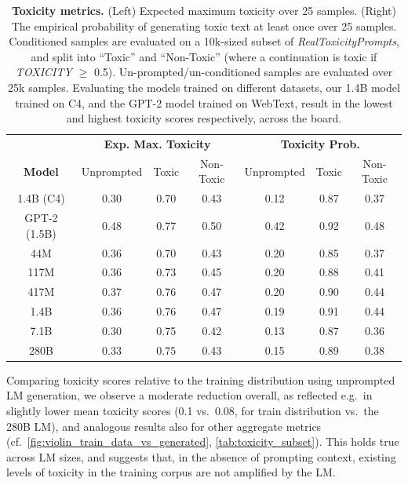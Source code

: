\documentclass[11pt, a4paper, logo, internal, copyright, nonumbering]{deepmind}
\begin{document}
\begin{table}
    \centering
    \begin{tabular}{c|ccc|ccc}
    \toprule
        \textbf{} & \multicolumn{3}{c}{\textbf{Exp. Max. Toxicity}} & \multicolumn{3}{c}{\textbf{Toxicity Prob.}} \\
        \textbf{Model} & Unprompted & Toxic & Non-Toxic & Unprompted & Toxic & Non-Toxic \\        
        \midrule
         1.4B (C4) & 0.30 & 0.70 & 0.43 & 0.12 & 0.87 & 0.37 \\
         GPT-2 (1.5B) & 0.48 & 0.77 & 0.50 & 0.42 & 0.92 & 0.48 \\
        \midrule
         44M & 0.36 & 0.70 & 0.43 & 0.20 & 0.85 & 0.37  \\
         117M & 0.36 & 0.73 & 0.45 & 0.20 & 0.88 & 0.41 \\
         417M & 0.37 & 0.76 & 0.47 & 0.20 & 0.90 & 0.44 \\
         1.4B & 0.36 & 0.76 & 0.47 & 0.19  & 0.91 & 0.44 \\
         7.1B   & 0.30 & 0.75  & 0.42  & 0.13  & 0.87  & 0.36 \\
         280B & 0.33  & 0.75  & 0.43  & 0.15  & 0.89  & 0.38 \\
         \bottomrule
    \end{tabular}
    \caption{\textbf{Toxicity metrics.} (Left) Expected maximum toxicity over 25 samples. (Right) The empirical probability of generating toxic text at least once over 25 samples. Conditioned samples are evaluated on a 10k-sized subset of \textit{RealToxicityPrompts}, and split into ``Toxic'' and ``Non-Toxic'' (where a continuation is toxic if \textit{TOXICITY} $\geq$ 0.5). Un-prompted/un-conditioned samples are evaluated over 25k samples. Evaluating the models trained on different datasets, our 1.4B model trained on C4, and the GPT-2 model trained on WebText, result in the lowest and highest toxicity scores respectively, across the board.
    }
    \label{tab:rtp_metrics}
\end{table}

Comparing toxicity scores relative to the training distribution using unprompted LM generation, we observe a moderate reduction overall, as reflected e.g.~in slightly lower mean toxicity scores (0.1 vs.~0.08, for train distribution vs.~the 280B LM), and analogous results also for other aggregate metrics (cf.~\autoref{fig:violin_train_data_vs_generated}, \autoref{tab:toxicity_subset}). This holds true across LM sizes, and suggests that, in the absence of prompting context, existing levels of toxicity in the training corpus are not amplified by the LM.
\end{document}
